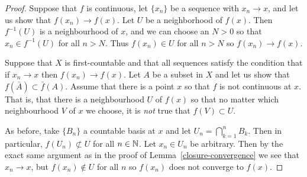 \begin{proof}
  Suppose that $f$ is continuous, let $\{x_n\}$ be a sequence with $x_n \to x$, and let us show that $f(x_n) \to f(x)$. Let $U$ be a neighborhood of $f(x)$. Then $f^{-1}(U)$ is a neighbourhood of $x$, and we can choose an $N > 0$ so that $x_n \in f^{-1}(U)$ for all $n > N$. Thus $f(x_n) \in U$ for all $n > N$ so $f(x_n) \to f(x)$.
  
  Suppose that $X$ is first-countable and that all sequences satisfy the condition that if $x_n \to x$ then $f(x_n) \to f(x)$. Let $A$ be a subset in $X$ and let us show that $f(\bar A) \subset \bar f(A)$. Assume that there is a point $x$ so that $f$ is not continuous at $x$. That is, that there is a neighbourhood $U$ of $f(x)$ so that no matter which neighbourhood $V$ of $x$ we choose, it is \emph{not} true that $f(V) \subset U$.
  
  As before, take $\{B_n\}$ a countable basis at $x$ and let $U_n = \bigcap_{k=1}^n B_k$. Then in particular, $f(U_n) \not\subset U$ for all $n \in \mathbb{N}$. Let $x_n \in U_n$ be arbitrary. Then by the exact same argument as in the proof of Lemma~\ref{closure-convergence} we see that $x_n \to x$, but $f(x_n) \notin U$ for all $n$ so $f(x_n)$ does not converge to $f(x)$.
\end{proof}
